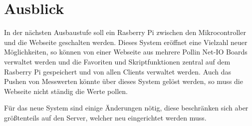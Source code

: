 \chapter{Ausblick}
In der nächsten Ausbaustufe soll ein Rasberry Pi zwischen den Mikrocontroller
und die Webseite geschalten werden. Dieses System eröffnet eine Vielzahl
neuer Möglichkeiten, so können von einer Webseite aus mehrere Pollin Net-IO
Boards verwaltet werden und die Favoriten und Skriptfunktionen zentral auf dem
Rasberry Pi gespeichert und von allen Clients verwaltet werden. Auch das Pushen von
Messwerten könnte über dieses System gelöst werden, so muss die Webseite nicht
ständig die Werte pollen.

Für das neue System sind einige Änderungen nötig, diese beschränken sich aber
größtenteils auf den Server, welcher neu eingerichtet werden muss.
